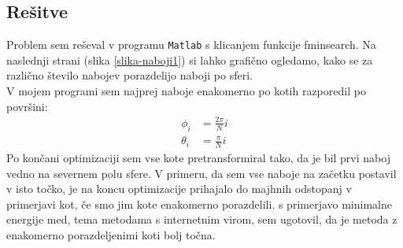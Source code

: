 \documentclass[slovene,11pt,a4paper]{article}
\numberwithin{equation}{section} %
\numberwithin{figure}{section} %
\numberwithin{table}{section} %
\begin{document}
\subsection{Rešitve}
Problem sem reševal v programu {\tt Matlab} s klicanjem funkcije fminsearch. Na naslednji strani (slika \ref{slika-naboji1}) si lahko grafično ogledamo, kako se za različno število nabojev porazdelijo naboji po sferi.\\
V mojem programi sem najprej naboje enakomerno po kotih razporedil po površini:
\begin{equation*}
\begin{aligned}
\phi_i & =\frac{2\pi}{N}i \\
\theta_i & =\frac{\pi}{N}i
\end{aligned}
\end{equation*}
Po končani optimizaciji sem vse kote pretransformiral tako, da je bil prvi naboj vedno na severnem polu sfere. V primeru, da sem vse naboje na začetku postavil v isto točko, je na koncu optimizacije prihajalo do majhnih odstopanj v primerjavi kot, če smo jim kote enakomerno porazdelili. s primerjavo minimalne energije med, tema metodama s internetnim virom, sem ugotovil, da je metoda z enakomerno porazdeljenimi koti bolj točna.
\end{document}
